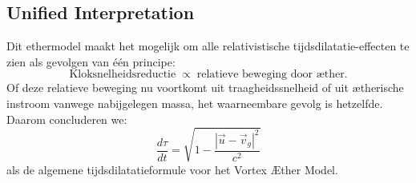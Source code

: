 \subsection*{Unified Interpretation}

Dit ethermodel maakt het mogelijk om alle relativistische tijdsdilatatie-effecten te zien als gevolgen van één principe:
\[
    \text{Kloksnelheidsreductie} \;\propto\; \text{relatieve beweging door æther}.
\]
Of deze relatieve beweging nu voortkomt uit traagheidssnelheid of uit ætherische instroom vanwege nabijgelegen massa, het waarneembare gevolg is hetzelfde. Daarom concluderen we:
\[
    \boxed{\frac{d\tau}{dt} = \sqrt{1 - \frac{|\vec{u} - \vec{v}_g|^2}{c^2}}}
\]
als de algemene tijdsdilatatieformule voor het Vortex Æther Model.